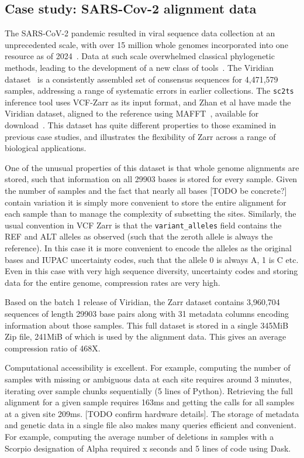 \documentclass[a4paper,num-refs]{oup-contemporary}
\begin{document}
\subsection{Case study: SARS-Cov-2 alignment data}
The SARS-CoV-2 pandemic resulted in viral sequence data collection at
an unprecedented scale, with over 15 million whole genomes incorporated into
one resource as of 2024~\citep{hinrichs2024ongoing}. Data at such scale
overwhelmed classical phylogenetic methods, leading to the development
of a new class of tools~\citep{turakhia2021ultrafast,ye2022matoptimize,zhan2023towards}.
The Viridian dataset~\citep{hunt2024addressing} is a consistently assembled
set of consensus sequences for 4,471,579 samples, addressing a range of systematic
errors in earlier collections. The \texttt{sc2ts} inference tool uses VCF-Zarr as its
input format, and Zhan et al have made the Viridian dataset,
aligned to the reference using MAFFT~\citep{katoh2013mafft},
available for download~\citep{zhan2023towards}. This dataset has quite
different properties to those examined in previous case studies, and
illustrates the flexibility of Zarr across a range of biological applications.

One of the unusual properties of this dataset is that whole genome alignments
are stored, such that information on all 29903 bases is stored for every
sample. Given the number of samples and the fact that nearly all bases
[TODO be concrete?] contain variation it is simply more convenient to
store the entire alignment for each sample than to manage the complexity
of subsetting the sites. Similarly, the usual convention in VCF Zarr
is that the \texttt{variant\_alleles} field contains the REF and ALT
alleles as observed (such that the zeroth allele is always the reference).
In this case it is more convenient to encode the alleles as the original
bases and IUPAC uncertainty codes, such that the allele 0 is always A, 1 is C etc.
Even in this case with very high sequence diversity, uncertainty codes and
storing data for the entire genome, compression rates are very high.

Based on the batch 1 release of Viridian, the Zarr dataset contains
3,960,704 sequences of length 29903 base pairs along with 31 metadata columns
encoding information about those samples. This full dataset is stored in a
single 345MiB Zip file, 241MiB of which is used by the alignment data. This
gives an average compression ratio of 468X.

Computational accessibility is excellent. For example, computing the number of
samples with missing or ambiguous data at each site requires around 3 minutes,
iterating over sample chunks sequentially (5 lines of Python).
Retrieving the full alignment for a given sample requires 163ms and
getting the calls for all samples at a given site 209ms. [TODO confirm hardware
details]. The storage of metadata and genetic data in a single file also
makes many queries efficient and convenient. For example, computing the
average number of deletions in samples with a Scorpio designation of Alpha
required x seconds and 5 lines of code using Dask.
\end{document}
